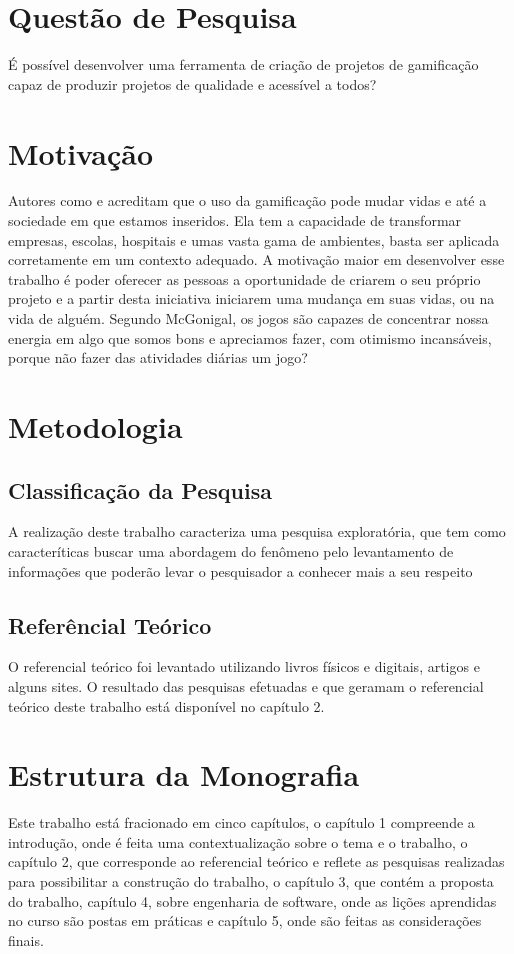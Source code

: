 \section{Questão de Pesquisa}

É possível desenvolver uma ferramenta de criação de projetos de gamificação capaz de produzir projetos de qualidade e acessível a todos?


\section{Motivação}

 Autores como \cite{chou2015actionable} e \cite{mcgonigal2011reality} acreditam que o uso da gamificação pode mudar vidas e até a sociedade em que estamos inseridos. Ela tem a capacidade de transformar empresas, escolas, hospitais e umas vasta gama de ambientes, basta ser aplicada corretamente em um contexto adequado. A motivação maior em desenvolver esse trabalho é poder oferecer as pessoas a oportunidade de criarem o seu próprio projeto e a partir desta iniciativa iniciarem uma mudança em suas vidas, ou na vida de alguém. Segundo McGonigal, os jogos são capazes de concentrar nossa energia em algo que somos bons e apreciamos fazer, com otimismo incansáveis, porque não fazer das atividades diárias um jogo?


\section{Metodologia}

\subsection{Classificação da Pesquisa}

A realização deste trabalho caracteriza uma pesquisa exploratória, que tem como caracteríticas buscar uma abordagem do fenômeno pelo levantamento de informações que poderão levar o pesquisador a conhecer mais a seu respeito \cite{}

\subsection{Referêncial Teórico}

O referencial teórico foi levantado utilizando livros físicos e digitais, artigos e alguns sites. O resultado das pesquisas efetuadas e que geramam o referencial teórico deste trabalho está disponível no capítulo 2.

\section{Estrutura da Monografia}

Este trabalho está fracionado em cinco capítulos, o capítulo 1 compreende a introdução, onde é feita uma contextualização sobre o tema e o trabalho, o capítulo 2, que corresponde ao referencial teórico e reflete as pesquisas realizadas para possibilitar a construção do trabalho, o capítulo 3, que contém a proposta do trabalho, capítulo 4, sobre engenharia de software, onde as lições aprendidas no curso são postas em práticas e capítulo 5, onde são feitas as considerações finais.
